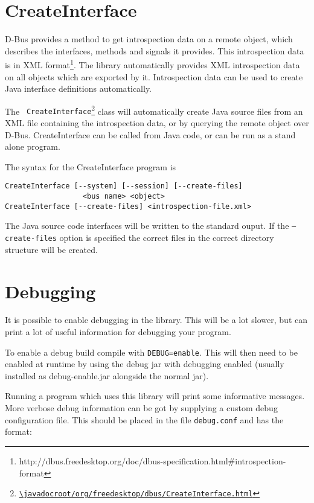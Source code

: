 \documentclass[a4paper,12pt]{article}
\begin{document}
\section{CreateInterface}
\label{sec:create}

D-Bus provides a method to get introspection data on a remote object, which
describes the interfaces, methods and signals it provides.  This introspection
data is in XML
format\footnote{http://dbus.freedesktop.org/doc/dbus-specification.html\#introspection-format}.
The library automatically provides XML introspection data on all objects which
are exported by it.  Introspection data can be used to create Java interface
definitions automatically.

The {\tt
CreateInterface\footnote{\url{\javadocroot/org/freedesktop/dbus/CreateInterface.html}}}
class will automatically create Java source files from an XML file
containing the introspection data, or by querying the remote object
over D-Bus.  CreateInterface can be called from Java code, or can be run as a
stand alone program.  

The syntax for the CreateInterface program is

\begin{verbatim}
CreateInterface [--system] [--session] [--create-files] 
                  <bus name> <object>
CreateInterface [--create-files] <introspection-file.xml>
\end{verbatim}

The Java source code interfaces will be written to the standard ouput. If the
{\tt --create-files} option is specified the correct files in the
correct directory structure will be created.

\section{Debugging}

It is possible to enable debugging in the library. This will be a lot slower,
but can print a lot of useful information for debugging your program.

To enable a debug build compile with {\tt DEBUG=enable}. This will then need to be
enabled at runtime by using the debug jar with debugging enabled (usually
installed as debug-enable.jar alongside the normal jar).

Running a program which uses this library will print some informative messages.
More verbose debug information can be got by supplying a custom debug
configuration file. This should be placed in the file {\tt debug.conf} and has the
format:
\end{document}
